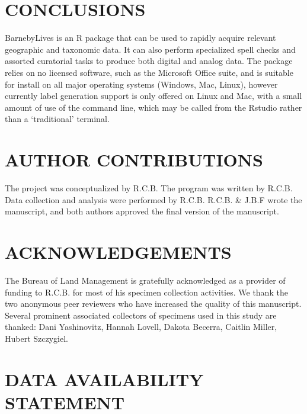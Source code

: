 \documentclass[
]{article}
\begin{document}
\section{CONCLUSIONS}\label{conclusions}

BarnebyLives is an R package that can be used to rapidly acquire
relevant geographic and taxonomic data. It can also perform specialized
spell checks and assorted curatorial tasks to produce both digital and
analog data. The package relies on no licensed software, such as the
Microsoft Office suite, and is suitable for install on all major
operating systems (Windows, Mac, Linux), however currently label
generation support is only offered on Linux and Mac, with a small amount
of use of the command line, which may be called from the Rstudio rather
than a `traditional' terminal.

\section{AUTHOR CONTRIBUTIONS}\label{author-contributions}

The project was conceptualized by R.C.B. The program was written by
R.C.B. Data collection and analysis were performed by R.C.B. R.C.B. \&
J.B.F wrote the manuscript, and both authors approved the final version
of the manuscript.

\section{ACKNOWLEDGEMENTS}\label{acknowledgements}

The Bureau of Land Management is gratefully acknowledged as a provider
of funding to R.C.B. for most of his specimen collection activities. We
thank the two anonymous peer reviewers who have increased the quality of
this manuscript. Several prominent associated collectors of specimens
used in this study are thanked: Dani Yashinovitz, Hannah Lovell, Dakota
Becerra, Caitlin Miller, Hubert Szczygiel.

\section{DATA AVAILABILITY STATEMENT}\label{data-availability-statement}
\end{document}
